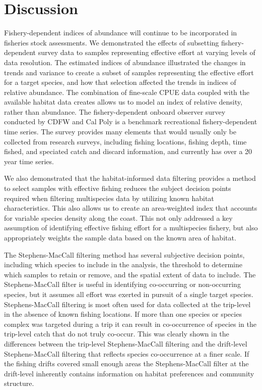 \documentclass[
  12pt,
  authoryear,
  preprint,
  3p]{elsarticle}
\begin{document}
\hypertarget{discussion}{%
\section{Discussion}\label{discussion}}

Fishery-dependent indices of abundance will continue to be incorporated
in fisheries stock assessments. We demonstrated the effects of
subsetting fishery-dependent survey data to samples representing
effective effort at varying levels of data resolution. The estimated
indices of abundance illustrated the changes in trends and variance to
create a subset of samples representing the effective effort for a
target species, and how that selection affected the trends in indices of
relative abundance. The combination of fine-scale CPUE data coupled with
the available habitat data creates allows us to model an index of
relative density, rather than abundance. The fishery-dependent onboard
observer survey conducted by CDFW and Cal Poly is a benchmark
recreational fishery-dependent time series. The survey provides many
elements that would usually only be collected from research surveys,
including fishing locations, fishing depth, time fished, and speciated
catch and discard information, and currently has over a 20 year time
series.

We also demonstrated that the habitat-informed data filtering provides a
method to select samples with effective fishing reduces the subject
decision points required when filtering multispecies data by utilizing
known habitat characteristics. This also allows us to create an
area-weighted index that accounts for variable species density along the
coast. This not only addressed a key assumption of identifying effective
fishing effort for a multispecies fishery, but also appropriately
weights the sample data based on the known area of habitat.

The Stephens-MacCall filtering method has several subjective decision
points, including which species to include in the analysis, the
threshold to determine which samples to retain or remove, and the
spatial extent of data to include. The Stephens-MacCall filter is useful
in identifying co-occurring or non-occurring species, but it assumes all
effort was exerted in pursuit of a single target species.
Stephens-MacCall filtering is most often used for data collected at the
trip-level in the absence of known fishing locations. If more than one
species or species complex was targeted during a trip it can result in
co-occurrence of species in the trip-level catch that do not truly
co-occur. This was clearly shown in the differences between the
trip-level Stephens-MacCall filtering and the drift-level
Stephens-MacCall filtering that reflects species co-occurrence at a
finer scale. If the fishing drifts covered small enough areas the
Stephens-MacCall filter at the drift-level inherently contains
information on habitat preferences and community structure.
\end{document}
